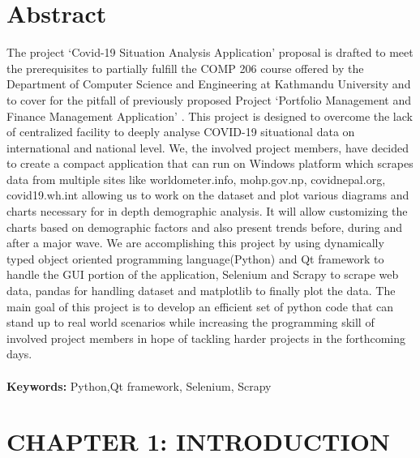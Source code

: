 \documentclass[12pt]{article}
\begin{document}
\section*{Abstract}
The project ‘Covid-19 Situation Analysis Application’ proposal is drafted to meet the prerequisites to partially fulfill the COMP 206 course offered by the 
Department of Computer Science and Engineering at Kathmandu University and to cover for the pitfall of previously proposed Project ‘Portfolio Management and 
Finance Management Application’ . This project is designed to overcome the lack of centralized facility to deeply analyse COVID-19 situational data on international 
and national level. We, the involved project members, have decided to create a compact application that can run on Windows platform which scrapes data from multiple sites 
like worldometer.info, mohp.gov.np, covidnepal.org, covid19.wh.int allowing us to work on the dataset and plot various diagrams and charts necessary for in 
depth demographic analysis. It will allow customizing the charts based on demographic factors and also present trends before,
during and after a major wave. We are accomplishing this project by using dynamically typed object oriented programming language(Python) and Qt framework to handle the GUI 
portion of the application, Selenium and Scrapy to scrape web data, pandas for handling dataset and matplotlib to finally plot the data. The main goal of this 
project is to develop an efficient set of python code that can stand up to real world scenarios while increasing the programming skill of involved project members in hope 
of tackling harder projects in the forthcoming days.
\\\\
\textbf{Keywords:} Python,Qt framework, Selenium, Scrapy

\clearpage
\thispagestyle{empty}
\tableofcontents

\clearpage
\thispagestyle{empty}
\listoffigures

\clearpage
{}
\section{CHAPTER 1: INTRODUCTION}
\end{document}
